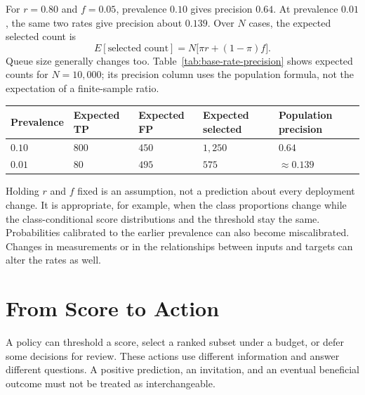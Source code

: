 For $r=0.80$ and $f=0.05$, prevalence $0.10$ gives precision $0.64$. At prevalence $0.01$, the same two rates give precision about $0.139$. Over $N$ cases, the expected selected count is
\[
E[\text{selected count}]=N\bigl[\pi r+(1-\pi)f\bigr].
\]
Queue size generally changes too. Table~\ref{tab:base-rate-precision} shows expected counts for $N=10{,}000$; its precision column uses the population formula, not the expectation of a finite-sample ratio.

\par\addvspace{\intextsep}\noindent\begin{minipage}{\linewidth}
\centering
\small
\setlength{\tabcolsep}{4pt}
\begin{tabular}{@{}L{1.65cm}L{2.02cm}L{2.02cm}L{2.02cm}L{2.16cm}@{}}
\toprule
Prevalence & Expected TP & Expected FP & Expected selected & Population precision\\
\midrule
$0.10$ & $800$ & $450$ & $1{,}250$ & $0.64$\\
$0.01$ & $80$ & $495$ & $575$ & $\approx0.139$\\
\bottomrule
\end{tabular}
\label{tab:base-rate-precision}
\end{minipage}\par\addvspace{\intextsep}

Holding $r$ and $f$ fixed is an assumption, not a prediction about every deployment change. It is appropriate, for example, when the class proportions change while the class-conditional score distributions and the threshold stay the same. Probabilities calibrated to the earlier prevalence can also become miscalibrated. Changes in measurements or in the relationships between inputs and targets can alter the rates as well.

\section{From Score to Action}
\label{sec:from-score-to-action}

A policy can threshold a score, select a ranked subset under a budget, or defer some decisions for review. These actions use different information and answer different questions. A positive prediction, an invitation, and an eventual beneficial outcome must not be treated as interchangeable.

